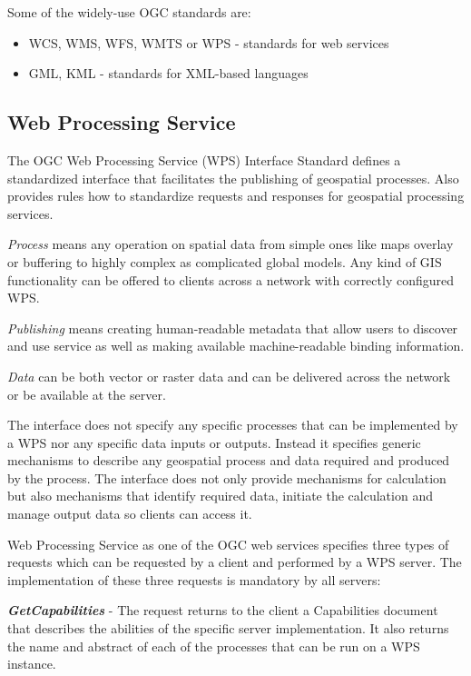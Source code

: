 Some of the widely-use OGC standards are:
\begin{itemize}
\item WCS, WMS, WFS, WMTS or WPS - standards for web services
\item GML, KML - standards for XML-based languages
\end{itemize}


\bigskip
\subsection{Web Processing Service}
The OGC Web Processing Service (WPS) Interface Standard defines a standardized interface
that facilitates the publishing of geospatial processes. Also provides rules how to standardize
requests and responses for geospatial processing services. 

\textit{Process} means any operation on spatial
data from simple ones like maps overlay or buffering to highly complex as complicated global models. Any kind of GIS 
functionality can be offered to clients across a network with correctly configured WPS. 

\textit{Publishing} means
creating human-readable metadata that allow users to discover and use service as well as making 
available machine-readable binding information.

\textit{Data} can be both vector or raster data and can be delivered across the network or be available
at the server.

The interface does not specify any specific processes that can be implemented by a WPS nor any specific
data inputs or outputs. Instead it specifies generic mechanisms to describe any geospatial process and
data required and produced by the process. The interface does not only provide mechanisms for calculation
but also mechanisms that identify required data, initiate the calculation and manage output data so clients
can access it. 

\bigskip
Web Processing Service as one of the OGC web services specifies three types of requests which can be requested
by a client and performed by a WPS server. The implementation of these three requests is mandatory by all servers:

\textbf{\textit{GetCapabilities}} - The request returns to the client a Capabilities document that describes the abilities
of the specific server implementation. It also returns the name and abstract of each of the processes that can
be run on a WPS instance.

